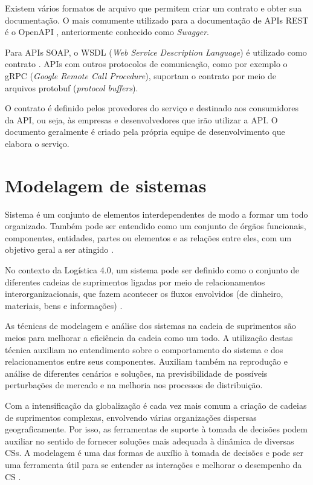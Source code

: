 Existem vários formatos de arquivo que permitem criar um contrato e obter sua documentação. O mais comumente utilizado para a documentação de APIs REST é o OpenAPI \cite{santos2020openapi}, anteriormente conhecido como \textit{Swagger}.

Para APIs SOAP, o WSDL (\textit{Web Service Description Language}) é utilizado como contrato \cite{ferris2003wsdl}. APIs com outros protocolos de comunicação, como por exemplo o gRPC (\textit{Google Remote Call Procedure}), suportam o contrato por meio de arquivos protobuf (\textit{protocol buffers}).

O contrato é definido pelos provedores do serviço e destinado aos consumidores da API, ou seja, às empresas e desenvolvedores que irão utilizar a API. O documento geralmente é criado pela própria equipe de desenvolvimento que elabora o serviço.

\section{Modelagem de sistemas}
\label{sec:modelagem-de-sistemas}

Sistema é um conjunto de elementos interdependentes de modo a formar um todo organizado. Também pode ser entendido como um conjunto de órgãos funcionais, componentes, entidades, partes ou elementos e as relações entre eles, com um objetivo geral a ser atingido \cite{mulbert2005sistemas}.

No contexto da Logística 4.0, um sistema pode ser definido como o conjunto de diferentes cadeias de suprimentos ligadas por meio de relacionamentos interorganizacionais, que fazem acontecer os fluxos envolvidos (de dinheiro, materiais, bens e informações) \cite{oliveira2016supplychain}.

As técnicas de modelagem e análise dos sistemas na cadeia de suprimentos são meios para melhorar a eficiência da cadeia como um todo. A utilização destas técnica auxiliam no entendimento sobre o comportamento do sistema e dos relacionamentos entre seus componentes. Auxiliam também na reprodução e análise de diferentes cenários e soluções, na previsibilidade de possíveis perturbações de mercado e na melhoria nos processos de distribuição.

Com a intensificação da globalização é cada vez mais comum a criação de cadeias de suprimentos complexas, envolvendo várias organizações dispersas geograficamente. Por isso, as ferramentas de suporte à tomada de decisões podem auxiliar no sentido de fornecer soluções mais adequada à dinâmica de diversas CSs. A modelagem é uma das formas de auxílio à tomada de decisões e pode ser uma ferramenta útil para se entender as interações e melhorar o desempenho da CS \cite{oliveira2016supplychain}.

